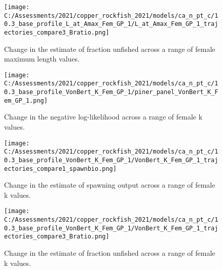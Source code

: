 \documentclass[11pt,
  english,
  a4paper,
]{article}
\begin{document}

\begin{figure}
\centering
\texttt{[image: C:/Assessments/2021/copper\_rockfish\_2021/models/ca\_n\_pt\_c/10.3\_base\_profile\_L\_at\_Amax\_Fem\_GP\_1/L\_at\_Amax\_Fem\_GP\_1\_trajectories\_compare3\_Bratio.png]}
\caption{Change in the estimate of fraction unfished across a range of female maximum length values.\label{fig:linf-depl}}
\end{figure}

\tagmcend\tagstructend


\begin{figure}
\centering
\texttt{[image: C:/Assessments/2021/copper\_rockfish\_2021/models/ca\_n\_pt\_c/10.3\_base\_profile\_VonBert\_K\_Fem\_GP\_1/piner\_panel\_VonBert\_K\_Fem\_GP\_1.png]}
\caption{Change in the negative log-likelihood across a range of female k values.\label{fig:k-profile}}
\end{figure}

\tagmcend\tagstructend


\begin{figure}
\centering
\texttt{[image: C:/Assessments/2021/copper\_rockfish\_2021/models/ca\_n\_pt\_c/10.3\_base\_profile\_VonBert\_K\_Fem\_GP\_1/VonBert\_K\_Fem\_GP\_1\_trajectories\_compare1\_spawnbio.png]}
\caption{Change in the estimate of spawning output across a range of female k values.\label{fig:k-ssb}}
\end{figure}

\tagmcend\tagstructend


\begin{figure}
\centering
\texttt{[image: C:/Assessments/2021/copper\_rockfish\_2021/models/ca\_n\_pt\_c/10.3\_base\_profile\_VonBert\_K\_Fem\_GP\_1/VonBert\_K\_Fem\_GP\_1\_trajectories\_compare3\_Bratio.png]}
\caption{Change in the estimate of fraction unfished across a range of female k values.\label{fig:k-depl}}
\end{figure}

\tagmcend\tagstructend

\end{document}
